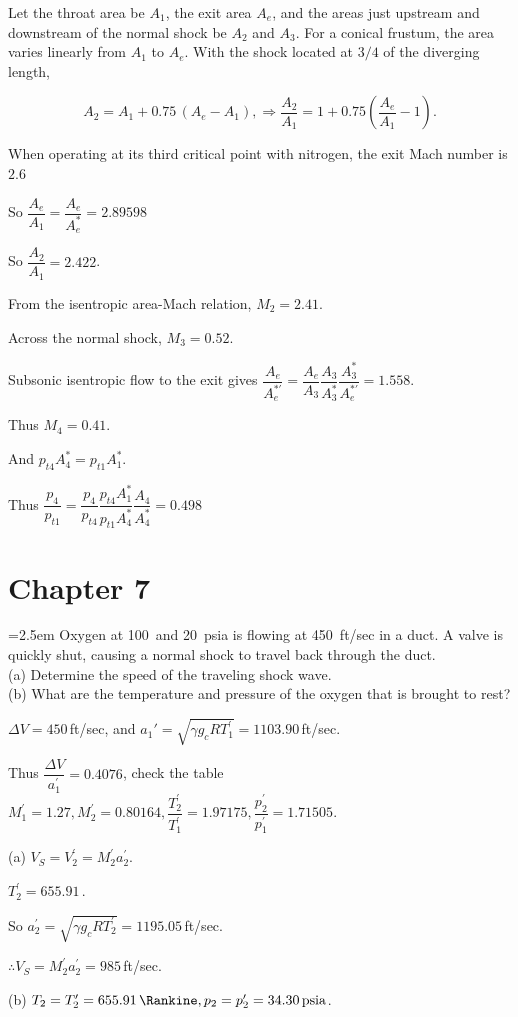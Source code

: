 \documentclass[12pt]{article}
\newlength{\questionlabelwidth}
\newcommand{\question}[2]{%
  \par\noindent
  {\hangindent=2.5em %
   \hangafter=1 %
   \makebox[\questionlabelwidth][l]{\textbf{#1}}#2\par}%
}
\begin{document}
\begin{answerbox}
Let the throat area be $A_1$, the exit area $A_e$, and the areas just
upstream and downstream of the normal shock be $A_2$ and $A_3$.
For a conical frustum, the area varies linearly from $A_1$ to $A_e$.
With the shock located at $3/4$ of the diverging length,

\[
A_2 = A_1 + 0.75\,(A_e - A_1),
\Rightarrow 
\frac{A_2}{A_1}
=1+0.75\left(\frac{A_e}{A_1}-1\right).
\]

When operating at its third critical point with nitrogen, the exit Mach number is $2.6$

So $\dfrac{A_e}{A_1}=\dfrac{A_e}{A_e^{*}}=2.89598$

So $\dfrac{A_2}{A_1}=2.422$.


From the isentropic area-Mach relation, $M_2=2.41$.


Across the normal shock, $M_3=0.52$.

Subsonic isentropic flow to the exit gives $\dfrac{A_e}{A_e^{*\prime}}=\dfrac{A_e}{A_3}\dfrac{A_3}{A_3^{*}}\dfrac{A_3^{*}}{A_e^{*\prime}}=1.558$.

Thus $M_4=0.41$.

And $p_{t4}A_4^{*}=p_{t1}A_1^{*}$.

Thus $\dfrac{p_{4}}{p_{t1}} = \dfrac{p_{4}}{p_{t4}}\dfrac{p_{t4}A_{1}^{*}}{p_{t1}A_{4}^{*}}\dfrac{A_{4}}{A_{4}^{*}} = 0.498$

\end{answerbox}

\newpage

\section{Chapter 7}

\question{7.4}{Oxygen at 100\,\si{\Fahrenheit} and 20 \,\si{psia} is flowing at 450 \,\si{ft/sec} in a duct. A valve is quickly shut,
causing a normal shock to travel back through the duct.\\
(a) Determine the speed of the traveling shock wave.\\
(b) What are the temperature and pressure of the oxygen that is brought to rest?
}

\begin{answerbox}
$\Delta V=450$\,\si{ft/sec}, and \(a_1{\prime}=\sqrt{\gamma g_c R T_1^{\prime}}=1103.90\)\,\si{ft/sec}.

Thus \(\dfrac{\Delta V}{a_1^{\prime}}=0.4076\), check the table \(M_1^{\prime}=1.27, M_2^{\prime}=0.80164, \dfrac{T_2^{\prime}}{T_1^{\prime}}=1.97175, \dfrac{p_2^{\prime}}{p_1^{\prime}}=1.71505\).

(a) \(V_S=V_2^{\prime}=M_2^{\prime}a_2^{\prime}\).

\(T_2^{\prime}=655.91\)\,\si{\Rankine}.

So \(a_2^{\prime}=\sqrt{\gamma g_c R T_2^{\prime}}=1195.05\)\,\si{ft/sec}.

\(\therefore V_S=M_2^{\prime}a_2^{\prime}=985\)\,\si{ft/sec}.

(b) \(T_2=T_2^{\prime}=655.91\,\si{\Rankine}, p_2=p_2^{\prime}=34.30\,\si{psia}\).
\end{answerbox}
\end{document}
